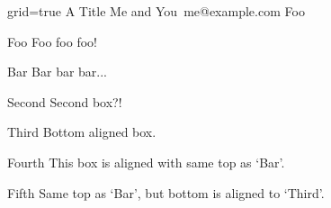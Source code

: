 \documentclass[landscape,paperwidth=180cm,paperheight=120cm]{baposter}
\begin{document}
\begin{poster}
  {grid=true}
  { } %
  {A Title} %
  {Me and You\ me@example.com} %
  { Foo } %
  
  \begin{posterbox}[name=contribution,column=0,row=0,span=2]{Foo}
    Foo foo foo!
  \end{posterbox}
  
  \begin{posterbox}[name=abstract,column=0,below=contribution]{Bar}
    Bar bar bar...
  \end{posterbox}
  
  \begin{posterbox}[name=second,column=1,row=0.3,height=0.30,textborder=rectangle]{Second}
    Second box?!
  \end{posterbox}

  \begin{posterbox}[name=third,column=2,bottomaligned=second,row=0.4,textborder=rectangle]{Third}
    Bottom aligned box.
  \end{posterbox}

  \begin{posterbox}[name=fourth,column=2,aligned=abstract]{Fourth}
    This box is aligned with same top as `Bar'.
  \end{posterbox}

  \begin{posterbox}[name=fifth,column=3,aligned=abstract,bottomaligned=third,textborder=rectangle]{Fifth}
    Same top as `Bar', but bottom is aligned to `Third'.
  \end{posterbox}

\end{poster}
\end{document}
